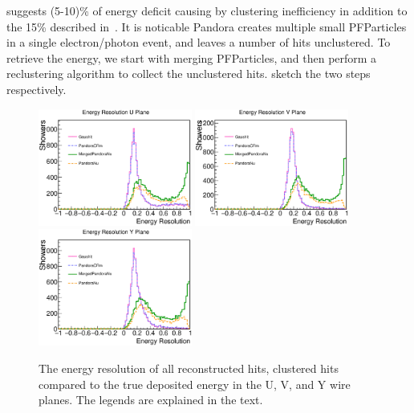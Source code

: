  suggests (5-10)\% of energy deficit 
causing by clustering
inefficiency in addition to the 15\% described in~.
It is noticable Pandora creates multiple small PFParticles in 
a single electron/photon event, and leaves a number of hits unclustered.
To retrieve the energy, we start with merging PFParticles, and then
perform a reclustering algorithm to collect the unclustered hits.
 sketch the two steps respectively.

\begin{figure}[htbp]
\begin{center}
\includegraphics[width=0.45\textwidth]{figs/ongoing/clustering/EnergyResU.eps}
\includegraphics[width=0.45\textwidth]{figs/ongoing/clustering/EnergyResV.eps}
\includegraphics[width=0.45\textwidth]{figs/ongoing/clustering/EnergyResY.eps}
\caption{The energy resolution of all reconstructed hits, clustered hits 
compared to the
true deposited energy in the U, V, and Y wire planes.
The legends are explained in the text.}
\label{fig:clustering_deficiency}
\end{center}
\end{figure}

